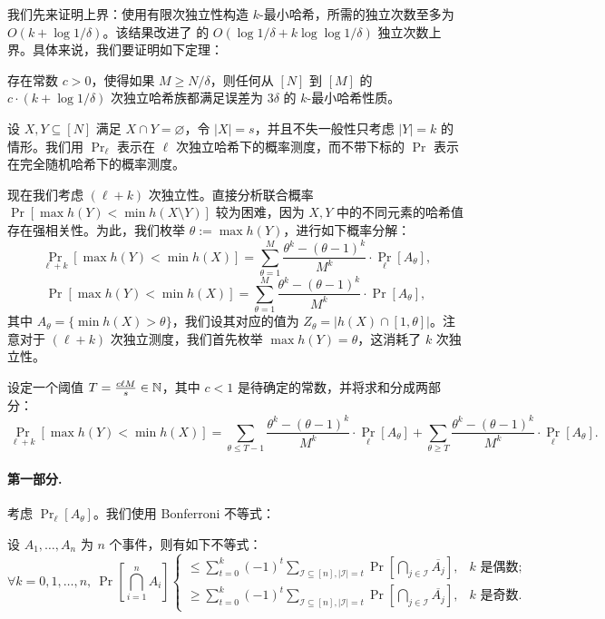 我们先来证明上界：使用有限次独立性构造 $k$-最小哈希，所需的独立次数至多为 $O(k + \log 1 / \delta)$。该结果改进了 \cite{minwise_FPS11} 的 $O(\log 1 / \delta + k \log \log 1 / \delta)$ 独立次数上界。具体来说，我们要证明如下定理：

\begin{theorem}\label{thm:k_log_1_eps_upper_bound}
    存在常数 $c > 0$，使得如果 $M \ge N / \delta$，则任何从 $[N]$ 到 $[M]$ 的 $c \cdot (k + \log 1 / \delta)$ 次独立哈希族都满足误差为 $3 \delta$ 的 $k$-最小哈希性质。
\end{theorem}

设 $X, Y \subseteq [N]$ 满足 $X \cap Y = \varnothing$，令 $|X| = s$，并且不失一般性只考虑 $|Y| = k$ 的情形。我们用 $\Pr_\ell$ 表示在 $\ell$ 次独立哈希下的概率测度，而不带下标的 $\Pr$ 表示在完全随机哈希下的概率测度。

现在我们考虑 $(\ell + k)$ 次独立性。直接分析联合概率 $\Pr[\max h(Y) < \min h(X \setminus Y)]$ 较为困难，因为 $X, Y$ 中的不同元素的哈希值存在强相关性。为此，我们枚举 $\theta := \max h(Y)$，进行如下概率分解：
$$
\Pr_{\ell + k}[\max h(Y) < \min h(X)] = \sum_{\theta = 1}^M \frac{\theta^k - (\theta - 1)^k}{M^k} \cdot \Pr_\ell[A_\theta],
$$
$$
\Pr[\max h(Y) < \min h(X)] = \sum_{\theta = 1}^M \frac{\theta^k - (\theta - 1)^k}{M^k} \cdot \Pr[A_\theta],
$$
其中 $A_\theta = \{\min h(X) > \theta\}$，我们设其对应的值为 $Z_\theta = \big| h(X) \cap [1, \theta] \big|$。注意对于 $(\ell + k)$ 次独立测度，我们首先枚举 $\max h(Y) = \theta$，这消耗了 $k$ 次独立性。

设定一个阈值 $T = \frac{c \ell M}{s} \in \mathbb{N}$，其中 $c < 1$ 是待确定的常数，并将求和分成两部分：
$$
\Pr_{\ell + k}[\max h(Y) < \min h(X)] = \sum_{\theta \le T - 1} \frac{\theta^k - (\theta - 1)^k}{M^k} \cdot \Pr_\ell[A_\theta] + \sum_{\theta \ge T} \frac{\theta^k - (\theta - 1)^k}{M^k} \cdot \Pr_\ell[A_\theta].
$$

\paragraph{第一部分.}

考虑 $\Pr_\ell[A_\theta]$。我们使用 Bonferroni 不等式：

\begin{lemma}
    设 $A_1, \ldots, A_n$ 为 $n$ 个事件，则有如下不等式：
    $$
    \forall k = 0, 1, \ldots, n,\ \Pr\left[ \bigcap_{i = 1}^n A_i \right]
    \begin{cases}
        \le \sum_{t = 0}^k (-1)^t \sum_{\mathcal{I} \subseteq [n], |\mathcal{I}| = t} \Pr\left[ \bigcap_{j \in \mathcal{I}} \overline{A_j} \right], & k\text{ 是偶数}; \\
        \ge \sum_{t = 0}^k (-1)^t \sum_{\mathcal{I} \subseteq [n], |\mathcal{I}| = t} \Pr\left[ \bigcap_{j \in \mathcal{I}} \overline{A_j} \right], & k\text{ 是奇数}.
    \end{cases}
    $$
\end{lemma}

